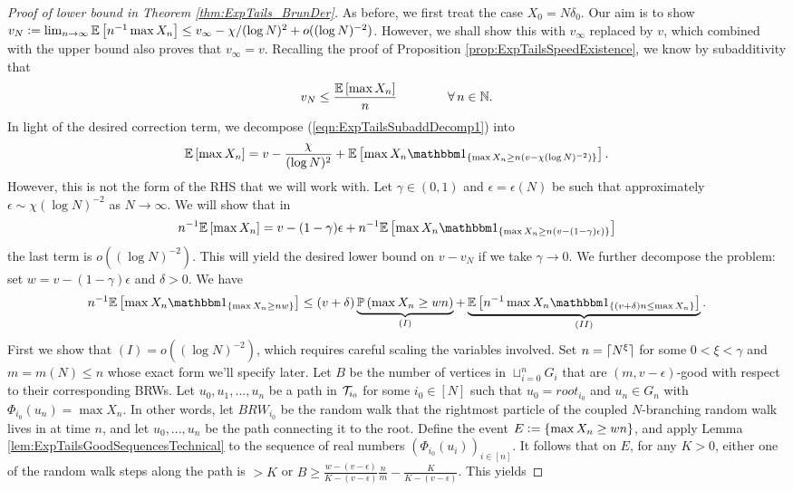 \begin{proof}[Proof of lower bound in Theorem \ref{thm:ExpTails_BrunDer}]
As before, we first treat the case $X_0 = N \delta_0$. Our aim is to show $v_N \defeq \lim_{n \to \infty} \Ex{n^{-1} \max X_n} \leq v_\infty - \chi / (\log N)^2 + o((\log N)^{-2})$. However, we shall show this with $v_\infty$ replaced by $v$, which combined with the upper bound also proves that $v_\infty = v$. Recalling the proof of Proposition \ref{prop:ExpTailsSpeedExistence}, we know by subadditivity that
\begin{equation}\label{eqn:ExpTailsSubaddDecomp1}
v_N \leq \frac{\Ex{\max X_n}}{n} \qquad\qquad\forall\, n \in \N. 
\end{equation}
In light of the desired correction term, we decompose (\ref{eqn:ExpTailsSubaddDecomp1}) into
\begin{equation}
\Ex{\max X_n} = v - \frac{\chi}{(\log N)^2} + \Ex{\max X_n \Ind_{\{\max X_n \geq n (v - \chi (\log N)^{-2})\}}}. 
\end{equation}
However, this is not the form of the RHS that we will work with. Let $\gamma \in (0,1)$ and $\epsilon = \epsilon(N)$ be such that approximately $\epsilon \sim \chi (\log N)^{-2}$ as $N \to \infty$. We will show that in
\begin{equation}
n^{-1} \Ex{\max X_n} = v - (1 - \gamma)\epsilon + n^{-1} \Ex{\max X_n \Ind_{\{\max X_n \geq n (v - (1 - \gamma) \epsilon)\}}}
\end{equation}
the last term is $o((\log N)^{-2})$. This will yield the desired lower bound on $v-v_N$ if we take $\gamma \to 0$. We further decompose the problem: set $w = v - (1 - \gamma) \epsilon$ and $\delta > 0$. We have
\begin{equation}
n^{-1} \Ex{\max X_n \Ind_{\{\max X_n \geq n w\}}} \leq (v+\delta)\underbrace{\Pr{\max X_n \geq w n}}_{(I)} + \underbrace{\Ex{n^{-1} \max X_n \Ind_{\{ (v + \delta)n \leq \max X_n \}}}}_{(II)}. \label{eqn:ExpTailsSubaddDecomp2} 
\end{equation}
First we show that $(I) = o((\log N)^{-2})$, which requires careful scaling the variables involved. Set $n = \ceil{N^\xi}$ for some $0 < \xi < \gamma$ and $m = m(N) \leq n$ whose exact form we'll specify later. Let $B$ be the number of vertices in $\sqcup_{i=0}^n G_i$ that are $(m, v - \epsilon)$-good with respect to their corresponding BRWs. Let $u_0, u_1, ..., u_n$ be a path in $\cal{T}_{i_0}$ for some $i_0 \in [N]$ such that $u_0 = root_{i_0}$ and $u_n \in G_n$ with $\Phi_{i_0}(u_n) = \max X_n$. In other words, let $BRW_{i_0}$ be the random walk that the rightmost particle of the coupled $N$-branching random walk lives in at time $n$, and let $u_0, ..., u_n$ be the path connecting it to the root. Define the event $E \defeq \{ \max X_n \geq w n \}$, and apply Lemma \ref{lem:ExpTailsGoodSequencesTechnical} to the sequence of real numbers $(\Phi_{i_0}(u_i))_{i \in [n]}$. It follows that on $E$, for any $K > 0$, either one of the random walk steps along the path is $> K$ or $B \geq \frac{w - (v - \epsilon)}{K - (v - \epsilon)}\frac{n}{m} - \frac{K}{K - (v - \epsilon)}$. This yields

\end{proof}
